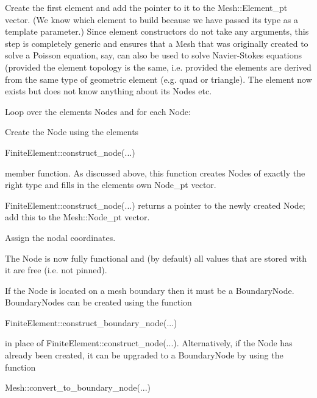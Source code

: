 \begin{DoxyEnumerate}
\item Create the first element and add the pointer to it to the {\ttfamily Mesh\+::\+Element\+\_\+pt} vector. (We know which element to build because we have passed its type as a template parameter.) Since element constructors do not take any arguments, this step is completely generic and ensures that a {\ttfamily Mesh} that was originally created to solve a Poisson equation, say, can also be used to solve Navier-\/\+Stokes equations (provided the element topology is the same, i.\+e. provided the elements are derived from the same type of geometric element (e.\+g. quad or triangle). The element now exists but does not know anything about its {\ttfamily Nodes} etc.
\item Loop over the element\textquotesingle{}s {\ttfamily Nodes} and for each Node\+:
\begin{DoxyEnumerate}
\item Create the {\ttfamily Node} using the element\textquotesingle{}s
\begin{DoxyCode}
FiniteElement::construct\_node(...) 
\end{DoxyCode}
 member function. As discussed above, this function creates {\ttfamily Nodes} of exactly the right type and fills in the element\textquotesingle{}s own {\ttfamily Node\+\_\+pt} vector.
\item {\ttfamily Finite\+Element\+::construct\+\_\+node}(...) returns a pointer to the newly created {\ttfamily Node}; add this to the {\ttfamily Mesh\+::\+Node\+\_\+pt} vector.
\item Assign the nodal coordinates.
\end{DoxyEnumerate}The {\ttfamily Node} is now fully functional and (by default) all values that are stored with it are free (i.\+e. not pinned).
\item If the {\ttfamily Node} is located on a mesh boundary then it must be a {\ttfamily Boundary\+Node}. {\ttfamily Boundary\+Nodes} can be created using the function 
\begin{DoxyCode}
FiniteElement::construct\_boundary\_node(...) 
\end{DoxyCode}
 in place of {\ttfamily Finite\+Element\+::construct\+\_\+node}(...). Alternatively, if the {\ttfamily Node} has already been created, it can be upgraded to a {\ttfamily Boundary\+Node} by using the function 
\begin{DoxyCode}
Mesh::convert\_to\_boundary\_node(...) 
\end{DoxyCode}

\end{DoxyEnumerate}
